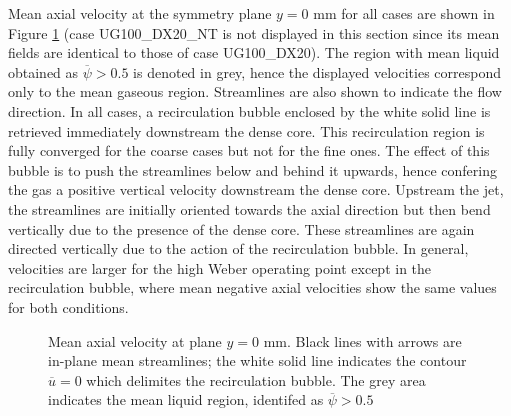 Mean axial velocity at the symmetry plane $y = 0$ mm for all cases are shown in Figure \ref{fig:JICF_turbulent_structures_plane_y0} (case UG100\_DX20\_NT  is not displayed in this section since its mean fields are identical to those of case UG100\_DX20). The region with mean liquid obtained as $\overline{\psi} > 0.5$ is denoted in grey, hence the displayed velocities correspond only to the mean gaseous region. Streamlines are also shown to indicate the flow direction. In all cases, a recirculation bubble enclosed by the white solid line is retrieved immediately downstream the dense core. This recirculation region is fully converged for the coarse cases but not for the fine ones. The effect of this bubble is to push the streamlines below and behind it upwards, hence confering the gas a positive vertical velocity downstream the dense core. Upstream the jet, the streamlines are initially oriented towards the axial direction but then bend vertically due to the presence of the dense core. These streamlines are again directed vertically due to the action of the recirculation bubble. In general, velocities are larger for the high Weber operating point except in the recirculation bubble, where mean negative axial velocities show the same values for both conditions.

\begin{figure}[ht]
\centering

\caption[Mean axial velocity at plane $y = 0$ mm]{Mean axial velocity at plane $y = 0$ mm. Black lines with arrows are in-plane mean streamlines; the white solid line indicates the contour $\overline{u} = 0$ which delimites the recirculation bubble. The grey area  indicates the mean liquid region, identifed as $\overline{\psi} > 0.5$}
\label{fig:JICF_turbulent_structures_plane_y0}
\end{figure}

